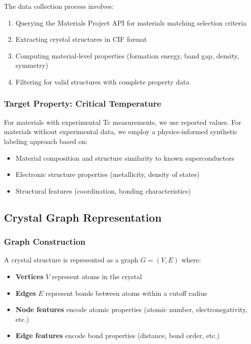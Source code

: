 \documentclass[11pt,a4paper]{article}
\begin{document}
The data collection process involves:

\begin{enumerate}
    \item Querying the Materials Project API for materials matching selection criteria
    \item Extracting crystal structures in CIF format
    \item Computing material-level properties (formation energy, band gap, density, symmetry)
    \item Filtering for valid structures with complete property data
\end{enumerate}

\subsubsection{Target Property: Critical Temperature}

For materials with experimental Tc measurements, we use reported values. For materials without experimental data, we employ a physics-informed synthetic labeling approach based on:

\begin{itemize}
    \item Material composition and structure similarity to known superconductors
    \item Electronic structure properties (metallicity, density of states)
    \item Structural features (coordination, bonding characteristics)
\end{itemize}

\subsection{Crystal Graph Representation}

\subsubsection{Graph Construction}

A crystal structure is represented as a graph $G = (V, E)$ where:

\begin{itemize}
    \item \textbf{Vertices} $V$ represent atoms in the crystal
    \item \textbf{Edges} $E$ represent bonds between atoms within a cutoff radius
    \item \textbf{Node features} encode atomic properties (atomic number, electronegativity, etc.)
    \item \textbf{Edge features} encode bond properties (distance, bond order, etc.)
\end{itemize}
\end{document}
